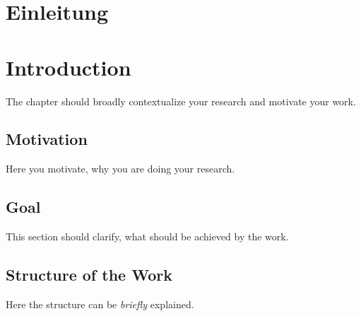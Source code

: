 {\chapter{Einleitung}}
{\chapter{Introduction}}

\label{sec:introduction}
The chapter should broadly contextualize your research and motivate your work.

\section{Motivation}
Here you motivate, why you are doing your research.

\section{Goal}
This section should clarify, what should be achieved by the work.

\section{Structure of the Work}
Here the structure can be \emph{briefly} explained.


